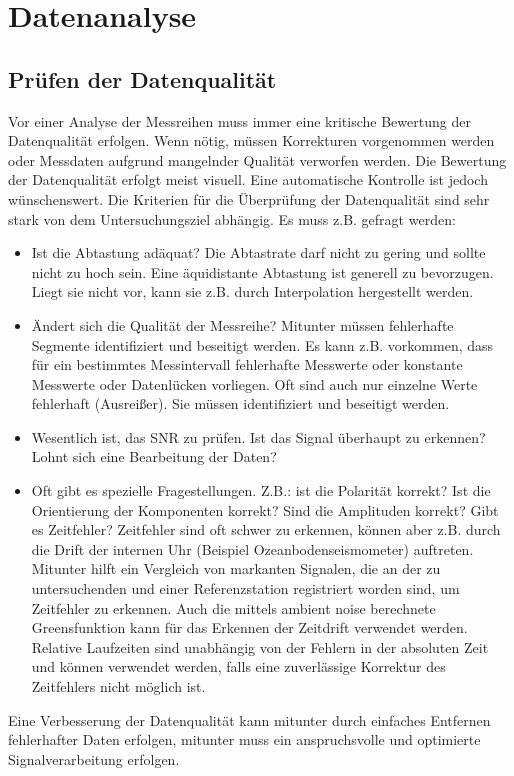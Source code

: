 \chapter{Datenanalyse}

\section{Prüfen der Datenqualität}
Vor einer Analyse der Messreihen muss immer eine kritische Bewertung der Datenqualität erfolgen. Wenn nötig, müssen Korrekturen vorgenommen werden oder Messdaten aufgrund mangelnder Qualität verworfen werden. Die Bewertung der Datenqualität erfolgt meist visuell. Eine automatische Kontrolle ist jedoch wünschenswert. Die Kriterien für die Überprüfung der Datenqualität sind sehr stark von dem Untersuchungsziel abhängig. Es muss z.B. gefragt werden:
\begin{itemize}
\item
Ist die Abtastung adäquat? Die Abtastrate darf nicht zu gering und sollte nicht zu hoch sein. Eine äquidistante Abtastung ist generell zu bevorzugen. Liegt sie nicht vor, kann sie z.B. durch Interpolation hergestellt werden.
\item
Ändert sich die Qualität der Messreihe? Mitunter müssen fehlerhafte Segmente identifiziert und beseitigt werden. Es kann z.B. vorkommen, dass für ein bestimmtes Messintervall fehlerhafte Messwerte oder konstante Messwerte oder Datenlücken vorliegen. Oft sind auch nur einzelne Werte fehlerhaft (Ausreißer). Sie müssen identifiziert und beseitigt werden.
\item
Wesentlich ist, das SNR zu prüfen. Ist das Signal überhaupt zu erkennen? Lohnt sich eine Bearbeitung der Daten?
\item
Oft gibt es spezielle Fragestellungen. Z.B.: ist die Polarität korrekt? Ist die Orientierung der Komponenten korrekt? Sind die Amplituden korrekt? Gibt es Zeitfehler? Zeitfehler sind oft schwer zu erkennen, können aber z.B. durch die Drift der internen Uhr (Beispiel Ozeanbodenseismometer) auftreten. Mitunter hilft ein Vergleich von markanten Signalen, die an der zu untersuchenden und einer Referenzstation registriert worden sind, um Zeitfehler zu erkennen. Auch die mittels ambient noise berechnete Greensfunktion kann für das Erkennen der Zeitdrift verwendet werden. Relative Laufzeiten sind unabhängig von der Fehlern in der absoluten Zeit und können verwendet werden, falls eine zuverlässige Korrektur des Zeitfehlers nicht möglich ist.    
\end{itemize}
Eine Verbesserung der Datenqualität kann mitunter durch einfaches Entfernen fehlerhafter Daten erfolgen, mitunter muss ein anspruchsvolle und optimierte Signalverarbeitung erfolgen. 

